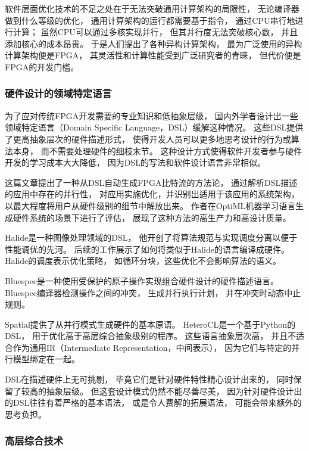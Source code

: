 软件层面优化技术的不足之处在于无法突破通用计算架构的局限性，
无论编译器做到什么等级的优化，
通用计算架构的运行都需要基于指令，
通过CPU串行地进行计算；
虽然CPU可以通过多核实现并行，
但其并行度无法突破核心数，
并且添加核心的成本昂贵。
于是人们提出了各种异构计算架构，
最为广泛使用的异构计算架构便是FPGA，
其灵活性和计算性能受到广泛研究者的青睐，
但代价便是FPGA的开发门槛。

\subsubsection{硬件设计的领域特定语言}

为了应对传统FPGA开发需要的专业知识和低抽象层级，
国内外学者设计出一些领域特定语言（Domain Specific Language，DSL）缓解这种情况。
这些DSL提供了更高抽象层次的硬件描述形式，
使得开发人员可以更多地思考设计的行为或算法本身，
而不需要处理硬件的细枝末节。
这种设计方式使得软件开发者参与硬件开发的学习成本大大降低，
因为DSL的写法和软件设计语言非常相似。

这篇文章\cite{dsl1}提出了一种从DSL自动生成FPGA比特流的方法论，
通过解析DSL描述的应用中存在的并行性，
对应用实施优化，并识别出适用于该应用的系统架构，
以最大程度将用户从硬件级别的细节中解放出来。
作者在OptiML机器学习语言生成硬件系统的场景下进行了评估，
展现了这种方法的高生产力和高设计质量。

Halide\cite{halide}是一种图像处理领域的DSL，
他开创了将算法规范与实现调度分离以便于性能调优的先河。
后续的工作展示了如何将类似于Halide的语言编译成硬件。
Halide的调度表示优化策略，
如循环分块，这些优化不会影响算法的语义。

Bluespec\cite{bluespec}是一种使用受保护的原子操作实现组合硬件设计的硬件描述语言。
Bluespec编译器检测操作之间的冲突，
生成并行执行计划，
并在冲突时动态中止规则。

Spatial\cite{spatial}提供了从并行模式生成硬件的基本原语。
HeteroCL\cite{heterocl}是一个基于Python的DSL，
用于优化高于高层综合抽象级别的程序。
这些语言抽象层次高，
并且不适合作为通用IR（Intermediate Representation，中间表示），
因为它们与特定的并行模型绑定在一起。

DSL在描述硬件上无可挑剔，
毕竟它们是针对硬件特性精心设计出来的，
同时保留了较高的抽象层级。
但这套设计模式仍然不能尽善尽美，
因为针对硬件设计出的DSL往往有着严格的基本语法，
或是令人费解的拓展语法，
可能会带来额外的思考负担。

\subsubsection{高层综合技术}

